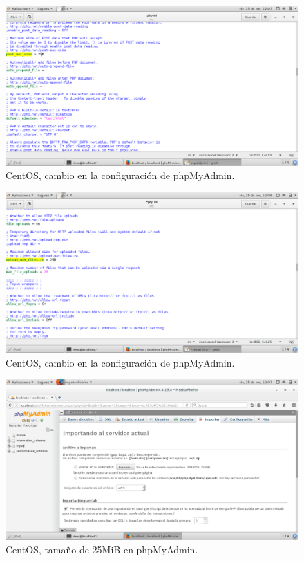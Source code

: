 \begin{figure}[H] 
	\centering
	\includegraphics[width=15cm]{./img/ejercicio13_3.png} 	
	\caption{CentOS, cambio en la configuración de phpMyAdmin.} \label{fig:ejercicio13_3}
\end{figure}

\begin{figure}[H] 
	\centering
	\includegraphics[width=15cm]{./img/ejercicio13_4.png} 	
	\caption{CentOS, cambio en la configuración de phpMyAdmin.} \label{fig:ejercicio13_4}
\end{figure}

\begin{figure}[H] 
	\centering
	\includegraphics[width=15cm]{./img/ejercicio13_5.png} 	
	\caption{CentOS, tamaño de 25MiB en phpMyAdmin.} \label{fig:ejercicio13_5}
\end{figure}



